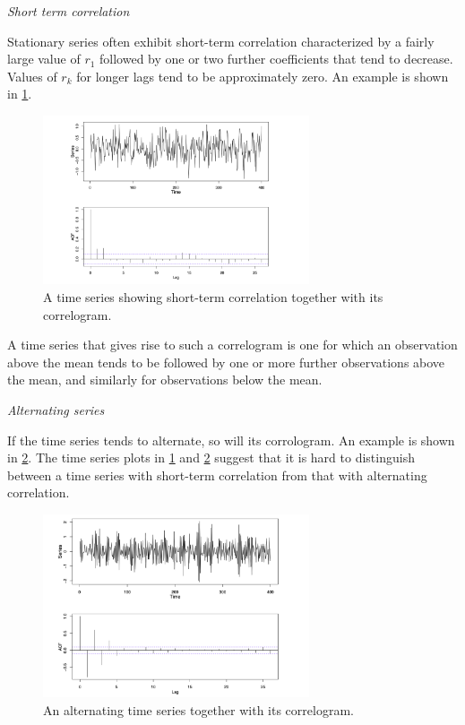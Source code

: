 \textit{Short term correlation}

Stationary series often exhibit short-term correlation characterized by a fairly large value of $r_1$ followed by one or two further coefficients that tend to decrease. Values of $r_k$ for longer lags tend to be approximately zero. An example is shown in \cref{fig:2.5}. 

\begin{figure}[ht]
	\centering
	\includegraphics[width=0.7\textwidth]{Chapter 2/fig2-5.png}
	\caption{A time series showing short-term correlation together with its correlogram.}
	\label{fig:2.5}
\end{figure}

A time series that gives rise to such a correlogram is one for which an observation above the mean tends to be followed by one or more further observations above the mean, and similarly for observations below the mean.

\textit{Alternating series}

If the time series tends to alternate, so will its corrologram. An example is shown in \cref{fig:2.6}. The time series plots in \cref{fig:2.5} and \cref{fig:2.6} suggest that it is hard to distinguish between a time series with short-term correlation from that with alternating correlation. 

\begin{figure}[ht]
	\centering
	\includegraphics[width=0.7\textwidth]{Chapter 2/fig2-6.png}
	\caption{An alternating time series together with its correlogram.}
	\label{fig:2.6}
\end{figure}

